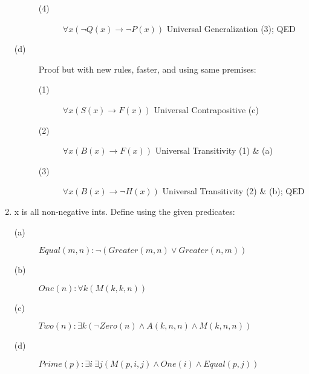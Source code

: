 \documentclass[12pt]{article}
\begin{document}
\begin{enumerate}
\begin{description}
\begin{description}
                        \item[(4)] $\forall x(\neg Q(x) \to \neg P(x))$ \null\hfill Universal Generalization (3); QED
                    \end{description}
                \item[(d)] Proof but with new rules, faster, and using same premises:
                    \begin{description}
                        \item[(1)] $\forall x(S(x) \to F(x))$ \null\hfill Universal Contrapositive (c)
                        \item[(2)] $\forall x(B(x) \to F(x))$ \null\hfill Universal Transitivity (1) \& (a)
                        \item[(3)] $\forall x(B(x) \to \neg H(x))$ \null\hfill Universal Transitivity (2) \& (b); QED
                    \end{description}
            \end{description}
        \item x is all non-negative ints. Define using the given predicates:
            \begin{description}
                \item[(a)] $Equal(m, n) : \neg (Greater(m, n) \lor Greater(n, m))$
                \item[(b)] $One(n) : \forall k(M(k, k, n))$
                \item[(c)] $Two(n) : \exists k(\neg Zero(n) \land A(k, n, n) \land M(k, n, n))$
                \item[(d)] $Prime(p) : \exists i\:\exists j(M(p, i, j) \land One(i) \land Equal(p, j))$
            \end{description}
    \end{enumerate}
\end{document}
